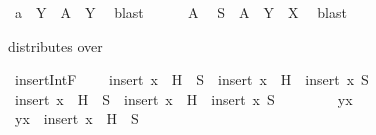 \begin{isabellebody}
\ {\isachardoublequoteopen}a\ {\isasyminter}\ Y\ {\isasymin}\ A\ {\isasyminter}{\isacharasterisk}{\kern0pt}\ Y{\isachardoublequoteclose}\ \isamarkupfalse%
\ blast\isanewline
\ \ \ \ \isamarkupfalse%
\ A{}\ \isamarkupfalse%
\ {\isachardoublequoteopen}S\ {\isasymin}\ {\isacharparenleft}{\kern0pt}A\ {\isasyminter}{\isacharasterisk}{\kern0pt}\ Y{\isacharparenright}{\kern0pt}\ {\isasyminter}{\isacharasterisk}{\kern0pt}\ X{\isachardoublequoteclose}\ \isamarkupfalse%
\ blast\isanewline
\ \ \isamarkupfalse%
\isanewline
{}\isamarkupfalse%
%
\endisatagproof
{\isafoldproof}%
%
\isadelimproof
%
\endisadelimproof
%
\begin{isamarkuptext}%
 distributes over \isa{{\isacharparenleft}{\kern0pt}{\isasyminter}{\isacharasterisk}{\kern0pt}{\isacharparenright}{\kern0pt}}%
\end{isamarkuptext}\isamarkuptrue%
\isamarkupfalse%
\ insert{\isacharunderscore}{\kern0pt}IntF{\isacharcolon}{\kern0pt}\ \isanewline
\ \ \ {\isachardoublequoteopen}insert\ x\ {\isacharbackquote}{\kern0pt}\ {\isacharparenleft}{\kern0pt}H\ {\isasyminter}{\isacharasterisk}{\kern0pt}\ S{\isacharparenright}{\kern0pt}\ {\isacharequal}{\kern0pt}\ {\isacharparenleft}{\kern0pt}insert\ x\ {\isacharbackquote}{\kern0pt}\ H{\isacharparenright}{\kern0pt}\ {\isasyminter}{\isacharasterisk}{\kern0pt}\ {\isacharparenleft}{\kern0pt}insert\ x\ S{\isacharparenright}{\kern0pt}{\isachardoublequoteclose}\isanewline
%
\isadelimproof
%
\endisadelimproof
%
\isatagproof
{}\isamarkupfalse%
\isanewline
\ \ \isamarkupfalse%
\ {\isachardoublequoteopen}insert\ x\ {\isacharbackquote}{\kern0pt}\ {\isacharparenleft}{\kern0pt}H\ {\isasyminter}{\isacharasterisk}{\kern0pt}\ S{\isacharparenright}{\kern0pt}\ {\isasymsubseteq}\ {\isacharparenleft}{\kern0pt}insert\ x\ {\isacharbackquote}{\kern0pt}\ H{\isacharparenright}{\kern0pt}\ {\isasyminter}{\isacharasterisk}{\kern0pt}\ {\isacharparenleft}{\kern0pt}insert\ x\ S{\isacharparenright}{\kern0pt}{\isachardoublequoteclose}\isanewline
\ \ \isamarkupfalse%
\isanewline
\ \ \ \ \isamarkupfalse%
\ y{\isacharunderscore}{\kern0pt}x\isanewline
\ \ \ \ \isamarkupfalse%
\ {\isachardoublequoteopen}y{\isacharunderscore}{\kern0pt}x\ {\isasymin}\ insert\ x\ {\isacharbackquote}{\kern0pt}\ {\isacharparenleft}{\kern0pt}H\ {\isasyminter}{\isacharasterisk}{\kern0pt}\ S{\isacharparenright}{\kern0pt}{\isachardoublequoteclose}\isanewline

\end{isabellebody}

